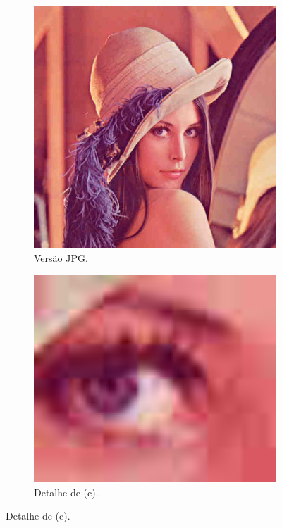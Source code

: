 \begin{figure}[!t]
  \begin{subfigure}{\WORIG}
    \centering
    \includegraphics[width=1\textwidth]{images/01/lena_25.png}
    \caption{\label{fig:compress:25} Versão JPG.}
  \end{subfigure}
  \begin{subfigure}{\WDET}
    \centering
    \includegraphics[width=1\textwidth]{images/01/lena_25_eye.png}
    \caption{\label{fig:compress:25:eye} Detalhe de (c).}
  \end{subfigure}


\end{figure}
